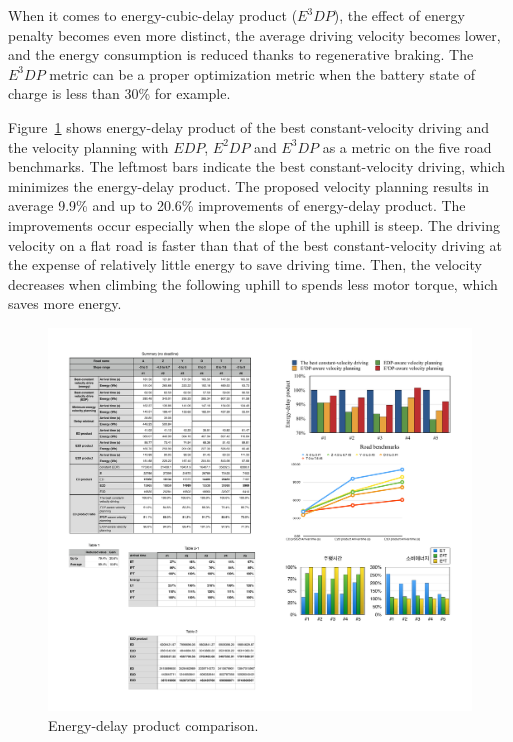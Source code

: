 \documentclass{IEEEtran}
\begin{document}
When it comes to energy-cubic-delay product ($E^3DP$), the effect of energy penalty becomes even more distinct, the average driving velocity becomes lower, and the energy consumption is reduced thanks to regenerative braking. The $E^3DP$ metric can be a proper optimization metric when the battery state of charge is less than 30\% for example.

Figure~\ref{fig:EDP_bar} shows energy-delay product of the best constant-velocity driving and the velocity planning with $EDP$, $E^2DP$ and $E^3DP$ as a metric on the five road benchmarks. The leftmost bars indicate the best constant-velocity driving, which minimizes the energy-delay product. The proposed velocity planning results in average 9.9\% and up to 20.6\% improvements of energy-delay product. The improvements occur especially when the slope of the uphill is steep. The driving velocity on a flat road is faster than that of the best constant-velocity driving at the expense of relatively little energy to save driving time. Then, the velocity decreases when climbing the following uphill to spends less motor torque, which saves more energy.

\begin{figure}	 %
\centering
\includegraphics[width=\hsize]{Figures/EDP_bar.pdf}
\caption{Energy-delay product comparison.}
\label{fig:EDP_bar}
\end{figure} 


\end{document}
